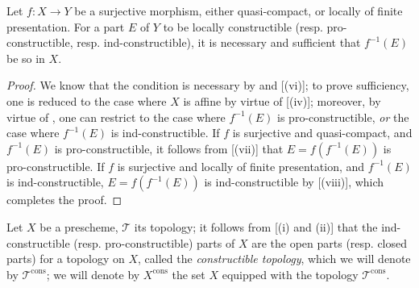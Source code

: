 \begin{corollary}[1.9.12]
\label{IV.1.9.12}
Let $f:X\to Y$ be a surjective morphism, either quasi-compact, or locally of finite presentation.
For a part $E$ of $Y$ to be locally constructible (resp. pro-constructible, resp. ind-constructible), it is necessary and sufficient that $f^{-1}(E)$ be so in $X$.
\end{corollary}


\begin{proof}
We know that the condition is necessary by  and [(vi)]; to prove sufficiency, one is reduced to the case where $X$ is affine by virtue of [(iv)]; moreover, by virtue of , one can restrict to the case where $f^{-1}(E)$ is pro-constructible, \emph{or} the case where $f^{-1}(E)$ is ind-constructible.
If $f$ is surjective and quasi-compact, and $f^{-1}(E)$ is pro-constructible, it follows from [(vii)] that $E=f(f^{-1}(E))$ is pro-constructible.
If $f$ is surjective and locally of finite presentation, and $f^{-1}(E)$ is ind-constructible, $E=f(f^{-1}(E))$ is ind-constructible by [(viii)], which completes the proof.
\end{proof}

\begin{env}[1.9.13]
\label{IV.1.9.13}
Let $X$ be a prescheme, $\mathscr{T}$ its topology; it follows from [(i) and (ii)] that the ind-constructible (resp. pro-constructible) parts of $X$ are the open parts (resp. closed parts) for a topology on $X$, called the \emph{constructible topology}, which we will denote by $\mathscr{T}^{\mathrm{cons}}$; we will denote by $X^{\mathrm{cons}}$ the set $X$ equipped with the topology $\mathscr{T}^{\mathrm{cons}}$.
\end{env}

